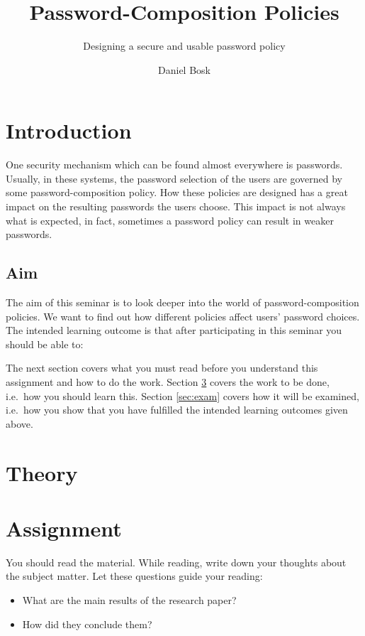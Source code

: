 \title{Password-Composition Policies}
\subtitle{Designing a secure and usable password policy}

\author{%
  Daniel Bosk
}

\maketitle


\section{Introduction}
\label{sec:intro}
One security mechanism which can be found almost everywhere is passwords.
Usually, in these systems, the password selection of the users are governed by 
some password-composition policy.
How these policies are designed has a great impact on the resulting passwords 
the users choose.
This impact is not always what is expected, in fact, sometimes a password 
policy can result in weaker passwords.

\subsection{Aim}
\label{sec:Syfte}
The aim of this seminar is to look deeper into the world of 
password-composition policies.
We want to find out how different policies affect users' password choices.
The intended learning outcome is that after participating in this seminar you 
should be able to:
\begin{itemize}
	
\end{itemize}

The next section covers what you must read before you understand this 
assignment and how to do the work.
Section \ref{sec:tasks} covers the work to be done, i.e.~how you should learn 
this.
Section \ref{sec:exam} covers how it will be examined, i.e.~how you show that 
you have fulfilled the intended learning outcomes given above.


\section{Theory}
\label{sec:theory}



\section{Assignment}
\label{sec:tasks}
You should read the material.
While reading, write down your thoughts about the subject matter.
Let these questions guide your reading:
\begin{itemize}
  \item What are the main results of the research paper?
  \item How did they conclude them?
\end{itemize}

